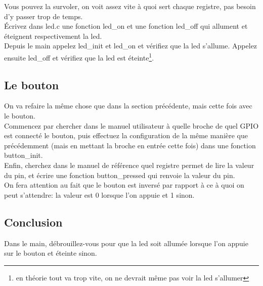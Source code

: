 \documentclass[a4paper,10pt]{article} %
\begin{document}
Vous pouvez la survoler, on voit assez vite à quoi sert chaque registre, pas besoin d'y passer trop de temps.\\

Écrivez dans led.c une fonction led\_on et une fonction led\_off qui allument et éteignent respectivement la led.\\

Depuis le main appelez led\_init et led\_on et vérifiez que la led s'allume. Appelez ensuite led\_off et vérifiez que la led est éteinte\footnote{en théorie tout va trop vite, on ne devrait même pas voir la led s'allumer}.

\subsection{Le bouton}
On va refaire la même chose que dans la section précédente, mais cette fois avec le bouton.\\

Commencez par chercher dans le manuel utilisateur à quelle broche de quel GPIO est connecté le bouton, puis effectuez la configuration de la même manière que précédemment (mais en mettant la broche en entrée cette fois) dans une fonction button\_init.\\

Enfin, cherchez dans le manuel de référence quel registre permet de lire la valeur du pin, et écrire une fonction button\_pressed qui renvoie la valeur du pin.\\

On fera attention au fait que le bouton est inversé par rapport à ce à quoi on peut s'attendre: la valeur est 0 lorsque l'on appuie et 1 sinon.

\subsection{Conclusion}
Dans le main, débrouillez-vous pour que la led soit allumée lorsque l'on appuie sur le bouton et éteinte sinon.
\end{document}
